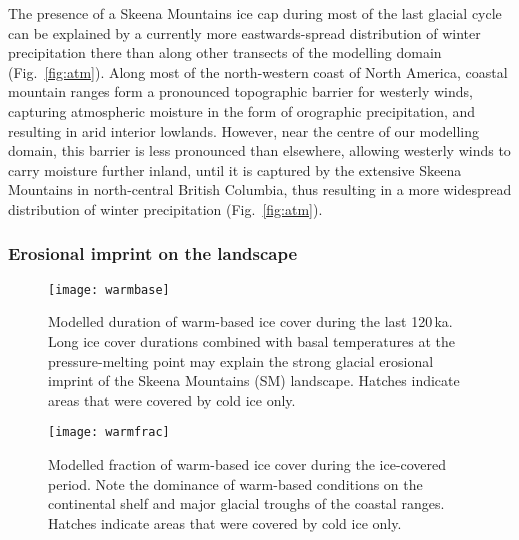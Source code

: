 \documentclass[tc]{copernicus}
\begin{document}
The presence of a Skeena Mountains ice cap during most of the last glacial
cycle can be explained by a currently more eastwards-spread distribution of
winter precipitation there than along other transects of the
modelling domain (Fig.~\ref{fig:atm}). Along most of the north-western coast of
North America, coastal mountain ranges form a pronounced topographic barrier
for westerly winds, capturing atmospheric moisture in the form of orographic
precipitation, and resulting in arid interior lowlands. However, near the
centre of our modelling domain, this barrier is less pronounced than elsewhere,
allowing westerly winds to carry moisture
further inland, until it is captured by the extensive Skeena Mountains in
north-central British Columbia, thus resulting in a more widespread
distribution of winter precipitation (Fig.~\ref{fig:atm}).

\subsubsection{Erosional imprint on the landscape}

\begin{figure*}
  \texttt{[image: warmbase]}
  \caption{Modelled duration of warm-based ice cover during the last
           120\,ka. Long ice cover durations combined with basal
           temperatures at the pressure-melting point may explain the strong
           glacial erosional imprint of the Skeena Mountains (SM) landscape.
           Hatches indicate areas that were covered by cold ice only.}
  \label{fig:warmbase}
\end{figure*}

\begin{figure*}
  \vspace{-0.5mm}  %
  \texttt{[image: warmfrac]}
  \caption{Modelled fraction of warm-based ice cover during the ice-covered
           period. Note the dominance of warm-based conditions on the
           continental shelf and major glacial troughs of the coastal ranges.
           Hatches indicate areas that were covered by cold ice only.}
  \label{fig:warmfrac}
\end{figure*}
\end{document}

